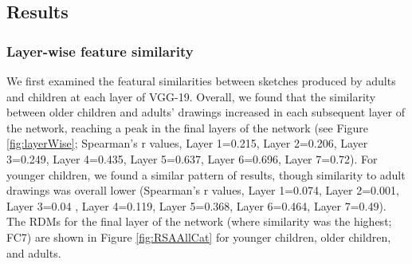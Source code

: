 \documentclass[10pt, letterpaper]{article}
\begin{document}
\subsection{Results}\label{results-1}

\subsubsection{Layer-wise feature
similarity}\label{layer-wise-feature-similarity}

We first examined the featural similarities between sketches produced by
adults and children at each layer of VGG-19. Overall, we found that the
similarity between older children and adults' drawings increased in each
subsequent layer of the network, reaching a peak in the final layers of
the network (see Figure \ref{fig:layerWise}; Spearman's r values, Layer
1=0.215, Layer 2=0.206, Layer 3=0.249, Layer 4=0.435, Layer 5=0.637,
Layer 6=0.696, Layer 7=0.72). For younger children, we found a similar
pattern of results, though similarity to adult drawings was overall
lower (Spearman's r values, Layer 1=0.074, Layer 2=0.001, Layer 3=0.04 ,
Layer 4=0.119, Layer 5=0.368, Layer 6=0.464, Layer 7=0.49). The RDMs for
the final layer of the network (where similarity was the highest; FC7)
are shown in Figure \ref{fig:RSAAllCat} for younger children, older
children, and adults.
\end{document}
